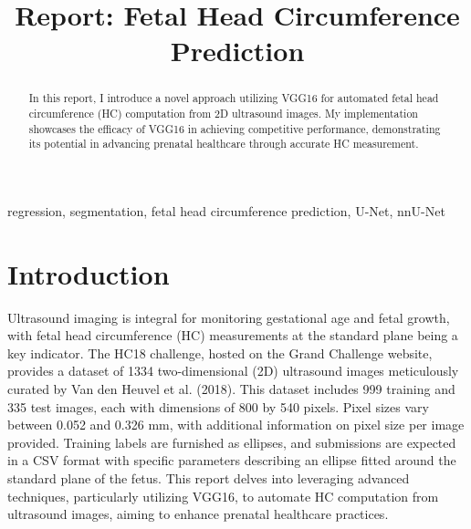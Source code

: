 \documentclass[conference]{IEEEtran}
\begin{document}
\title{Report: Fetal Head Circumference Prediction\\


}

\author{
}


\maketitle

\begin{abstract}
In this report, I introduce a novel approach utilizing VGG16 for automated fetal head circumference (HC) computation from 2D ultrasound images. My implementation showcases the efficacy of VGG16 in achieving competitive performance, demonstrating its potential in advancing prenatal healthcare through accurate HC measurement.
\end{abstract}

\begin{IEEEkeywords}
regression, segmentation, fetal head circumference prediction, U-Net, nnU-Net
\end{IEEEkeywords}

\section{\textbf{Introduction}}
Ultrasound imaging is integral for monitoring gestational age and fetal growth, with fetal head circumference (HC) measurements at the standard plane being a key indicator. The HC18 challenge, hosted on the Grand Challenge website, provides a dataset of 1334 two-dimensional (2D) ultrasound images meticulously curated by Van den Heuvel et al. (2018). This dataset includes 999 training and 335 test images, each with dimensions of 800 by 540 pixels. Pixel sizes vary between 0.052 and 0.326 mm, with additional information on pixel size per image provided. Training labels are furnished as ellipses, and submissions are expected in a CSV format with specific parameters describing an ellipse fitted around the standard plane of the fetus. This report delves into leveraging advanced techniques, particularly utilizing VGG16, to automate HC computation from ultrasound images, aiming to enhance prenatal healthcare practices. 
\end{document}
